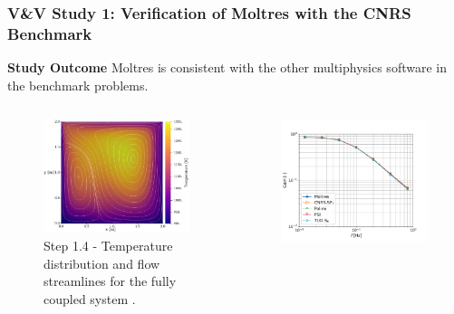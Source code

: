 \begin{frame}[noframenumbering]
  \frametitle{V\&V Study 1: Verification of Moltres with the CNRS Benchmark}
  \begin{block}{\textbf{Study Outcome}}
    Moltres is consistent with the other multiphysics software in the benchmark problems.
  \end{block}
  \begin{columns}
    \hfill
    \column[t]{4cm}
    \vspace{.3cm}
    \begin{figure}
      \centering
      \includegraphics[width=\columnwidth]{../images/full-coupled}
      \caption{Step 1.4 - Temperature distribution and flow streamlines for the fully
      coupled system \cite{park_verification_2022}.}
    \end{figure}
    \column[t]{4cm}
    \begin{figure}
      \centering
      \includegraphics[width=\columnwidth]{../images/2-1-gain-plot}

\end{figure}
\end{columns}
\end{frame}
